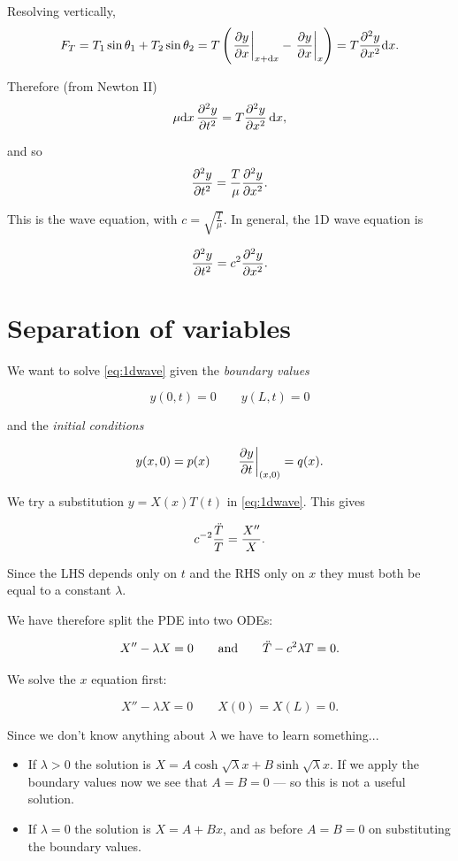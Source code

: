 \documentclass{notes}
\theoremstyle{plain}
\begin{document}
Resolving vertically,
\[
F_T = T_1 \sin \theta_1 + T_2 \sin \theta_2
= T \left( \left.\frac{\partial y}{\partial x}\right|_{x+\mathrm{d} x} -
\left.\frac{\partial y}{\partial x}\right|_x \right) = T \frac{\partial ^2 y}{\partial x^2} \mathrm{d} x.
\]

Therefore (from Newton II)
\[
\mu \mathrm{d} x\, \frac{\partial ^2 y}{\partial t^2} = T \frac{\partial ^2 y}{\partial x^2}\, \mathrm{d} x,
\]

and so
\[
\frac{\partial ^2 y}{\partial t^2} = \frac{T}{\mu} \frac{\partial ^2 y}{\partial x^2}.
\]

This is the wave equation, with $c = \sqrt{\frac{T}{\mu}}$.   In
general, the 1D wave equation is

\begin{equation}\label{eq:1dwave}
\frac{\partial ^2 y}{\partial t^2} = c^2 \frac{\partial ^2 y}{\partial x^2}.
\end{equation}

\section{Separation of variables}

We want to solve \eqref{eq:1dwave} given the \emph{boundary
  values}

\[
y(0,t) = 0 \qquad y(L,t) = 0
\]

and the \emph{initial conditions}

\[
y(x,0) = p(x) \qquad \left.\frac{\partial y}{\partial t}\right|_{(x,0)} = q(x).
\]

We try a substitution $y = X(x) T(t)$ in \eqref{eq:1dwave}.  This
gives

\[
c^{-2} \frac{\Ddot{T}}{T} = \frac{X''}{X}.
\]

Since the LHS depends only on $t$ and the RHS only on $x$ they must
both be equal to a constant $\lambda$.

We have therefore split the PDE into two ODEs:

\[
X'' - \lambda X = 0 \qquad \text{and} \qquad \Ddot{T} - c^2 \lambda T
= 0.
\]

We solve the $x$ equation first:

\[
X'' - \lambda X = 0 \qquad X(0) = X(L) = 0.
\]

Since we don't know anything about $\lambda$ we have to learn
something...

\begin{itemize}
\item If $\lambda > 0$ the solution is $X = A \cosh \sqrt{\lambda} x
+ B \sinh \sqrt{\lambda} x$.  If we apply the boundary values now we
see that $A = B = 0$ --- so this is not a useful solution.
\item If $\lambda = 0$ the solution is $X = A + B x$, and as before
  $A=B=0$ on substituting the boundary values.
\end{itemize}
\end{document}
